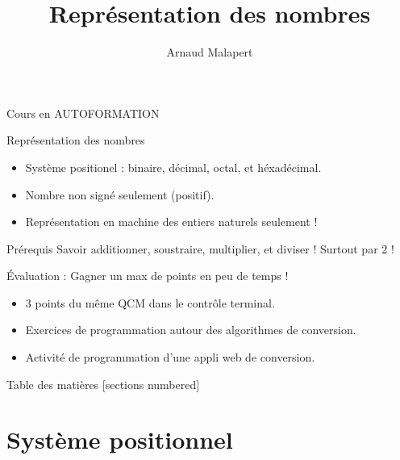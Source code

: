 \documentclass[10pt]{beamer}
\title{Représentation des nombres}
\author{Arnaud Malapert}
\begin{document}
\maketitle


\begin{frame}{Cours en AUTOFORMATION}

  \begin{block}{Représentation des nombres}
    \begin{itemize}
    \item Système positionel : binaire, décimal, octal, et héxadécimal.
    \item Nombre non signé seulement (positif).
    \item Représentation en machine des entiers naturels seulement !
    \end{itemize}
  \end{block}

  \begin{block}{Prérequis}
    Savoir additionner, soustraire, multiplier, et diviser ! Surtout par 2 !
  \end{block}

  \begin{alertblock}{Évaluation : Gagner un max de points en peu de temps !
}
    \begin{itemize}
    \item 3 points du même QCM dans le contrôle terminal.
    \item Exercices de programmation autour des algorithmes de conversion.
    \item Activité de programmation d'une appli web de conversion.
    \end{itemize}
  \end{alertblock}

\end{frame}


\begin{frame}{Table des matières}
  [sections numbered]
  \tableofcontents
\end{frame}


\section{Système positionnel}

\end{document}
